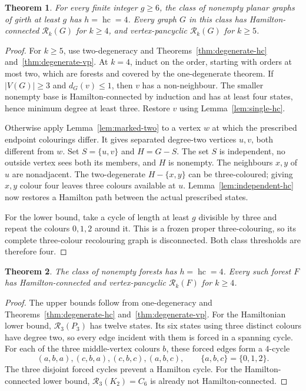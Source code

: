 \documentclass[11pt]{article}
\newtheorem{theorem}{Theorem}[section]
\theoremstyle{remark}
\newcommand{\R}{\mathcal R}
\newcommand{\Rk}{\mathcal R_k}
\newcommand{\hc}{\operatorname{hc}}
\numberwithin{equation}{section}
\numberwithin{table}{section}
\begin{document}
\begin{theorem}
\label{thm:girth6-hc}
For every finite integer $g\ge6$, the class of nonempty planar graphs
of girth at least $g$ has $h=\hc=4$.  Every graph $G$ in this
class has Hamilton-connected $\Rk(G)$ for $k\ge4$, and
vertex-pancyclic $\Rk(G)$ for $k\ge5$.
\end{theorem}

\begin{proof}
For $k\ge5$, use two-degeneracy and
Theorems~\ref{thm:degenerate-hc} and~\ref{thm:degenerate-vp}.
At $k=4$, induct on the order, starting with orders at most two,
which are forests and covered by the one-degenerate theorem.
If $|V(G)|\ge3$ and $d_G(v)\le1$, then $v$ has a non-neighbour.
The smaller nonempty base is Hamilton-connected by induction and has
at least four states, hence minimum degree at least three.  Restore
$v$ using Lemma~\ref{lem:single-hc}.

Otherwise apply Lemma~\ref{lem:marked-two} to a vertex $w$ at which
the prescribed endpoint colourings differ.  It gives separated
degree-two vertices $u,v$, both different from $w$.  Set
$S=\{u,v\}$ and $H=G-S$.  The set $S$ is independent, no outside
vertex sees both its members, and $H$ is nonempty.  The neighbours
$x,y$ of $u$ are nonadjacent.  The two-degenerate $H-\{x,y\}$
can be three-coloured; giving $x,y$ colour four leaves three colours
available at $u$.  Lemma~\ref{lem:independent-hc} now restores a
Hamilton path between the actual prescribed states.

For the lower bound, take a cycle of length at least $g$ divisible by
three and repeat the colours $0,1,2$ around it.  This is a frozen
proper three-colouring, so its complete three-colour recolouring graph
is disconnected.  Both class thresholds are therefore four.
\end{proof}

\begin{theorem}
\label{thm:forest-hc}
The class of nonempty forests has $h=\hc=4$.  Every such forest
$F$ has Hamilton-connected and vertex-pancyclic $\Rk(F)$ for
$k\ge4$.
\end{theorem}

\begin{proof}
The upper bounds follow from one-degeneracy and
Theorems~\ref{thm:degenerate-hc} and~\ref{thm:degenerate-vp}.
For the Hamiltonian lower bound, $\R_3(P_3)$ has twelve
states.  Its six states using three distinct colours have degree two,
so every edge incident with them is forced in a spanning cycle.
For each of the three middle-vertex colours $b$, these forced edges
form a $4$-cycle
\[
 (a,b,a),(c,b,a),(c,b,c),(a,b,c),
 \qquad \{a,b,c\}=\{0,1,2\}.
\]
The three disjoint forced cycles prevent a Hamilton cycle.  For the
Hamilton-connected lower bound, $\R_3(K_2)=C_6$
is already not Hamilton-connected.
\end{proof}
\end{document}
